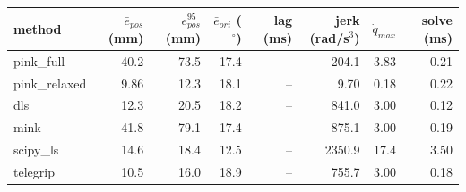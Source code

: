 \begin{tabular}{lrrrrrrr}
\toprule
method & $\bar{e}_{pos}$ (mm) & $e_{pos}^{95}$ (mm) & $\bar{e}_{ori}$ ($^\circ$) & lag (ms) & jerk (rad/s$^3$) & $\dot{q}_{max}$ & solve (ms) \\
\midrule
pink\_full & 40.2 & 73.5 & 17.4 & -- & 204.1 & 3.83 & 0.21 \\
pink\_relaxed & 9.86 & 12.3 & 18.1 & -- & 9.70 & 0.18 & 0.22 \\
dls & 12.3 & 20.5 & 18.2 & -- & 841.0 & 3.00 & 0.12 \\
mink & 41.8 & 79.1 & 17.4 & -- & 875.1 & 3.00 & 0.19 \\
scipy\_ls & 14.6 & 18.4 & 12.5 & -- & 2350.9 & 17.4 & 3.50 \\
telegrip & 10.5 & 16.0 & 18.9 & -- & 755.7 & 3.00 & 0.18 \\
\bottomrule
\end{tabular}
